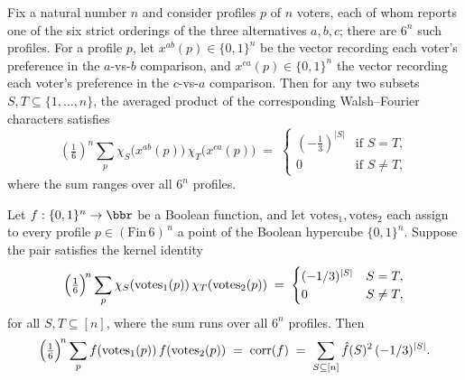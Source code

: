 \begin{lemma}
\label{ArrowTheorem.profile_kernel_abca}
\leanok
{}
Fix a natural number $n$ and consider profiles $p$ of $n$ voters, each of whom reports
one of the six strict orderings of the three alternatives $a, b, c$; there are $6^n$
such profiles. For a profile $p$, let $x^{ab}(p) \in \{0,1\}^n$ be the vector recording
each voter's preference in the $a$-vs-$b$ comparison, and $x^{ca}(p) \in \{0,1\}^n$ the
vector recording each voter's preference in the $c$-vs-$a$ comparison. Then for any two
subsets $S, T \subseteq \{1,\dots,n\}$, the averaged product of the corresponding
Walsh–Fourier characters satisfies
\[
\left(\tfrac{1}{6}\right)^{\!n} \sum_{p}
\chi_S\bigl(x^{ab}(p)\bigr)\,\chi_T\bigl(x^{ca}(p)\bigr)
  \;=\;
\begin{cases} \left(-\tfrac{1}{3}\right)^{|S|} & \text{if } S = T,\\[2pt] 0 & \text{if }
S \neq T, \end{cases}
\]
where the sum ranges over all $6^n$ profiles.
\end{lemma}

\begin{lemma}
\label{ArrowTheorem.expected_product_helper}
\leanok
{}
Let $f:\{0,1\}^n\to\bbr$ be a Boolean function, and let
$\mathrm{votes}_1,\mathrm{votes}_2$ each assign to every profile
$p\in(\mathrm{Fin}\,6)^{\,n}$ a point of the Boolean hypercube $\{0,1\}^n$. Suppose the
pair satisfies the kernel identity
\[
\Bigl(\tfrac16\Bigr)^{\!n}\sum_{p}
\chi_S(\mathrm{votes}_1(p))\,\chi_T(\mathrm{votes}_2(p))
  \;=\; \begin{cases}(-1/3)^{|S|} & S = T,\\ 0 & S \ne T,\end{cases}
\]
for all $S,T\subseteq[n]$, where the sum runs over all $6^n$ profiles. Then
\[
  \Bigl(\tfrac16\Bigr)^{\!n}\sum_{p} f(\mathrm{votes}_1(p))\,f(\mathrm{votes}_2(p))
  \;=\; \mathrm{corr}(f)
  \;=\; \sum_{S\subseteq[n]} \hat f(S)^2\,(-1/3)^{|S|}.
\]
\end{lemma}

